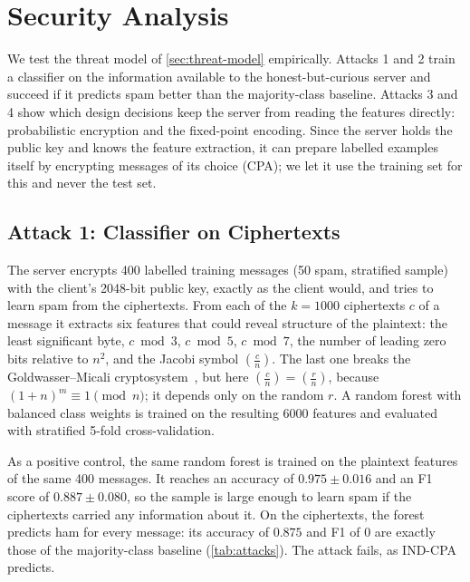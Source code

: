 \section{Security Analysis}\label{sec:security}

We test the threat model of \cref{sec:threat-model} empirically.
Attacks 1 and 2 train a classifier on the information available to the honest-but-curious server and succeed if it predicts spam better than the majority-class baseline.
Attacks 3 and 4 show which design decisions keep the server from reading the features directly: probabilistic encryption and the fixed-point encoding.
Since the server holds the public key and knows the feature extraction, it can prepare labelled examples itself by encrypting messages of its choice (CPA); we let it use the training set for this and never the test set.

\subsection{Attack 1: Classifier on Ciphertexts}\label{sec:attack-ciphertext}

The server encrypts \num{400} labelled training messages (\num{50} spam, stratified sample) with the client's \num{2048}-bit public key, exactly as the client would, and tries to learn spam from the ciphertexts.
From each of the $k = 1000$ ciphertexts $c$ of a message it extracts six features that could reveal structure of the plaintext: the least significant byte, $c \bmod 3$, $c \bmod 5$, $c \bmod 7$, the number of leading zero bits relative to $n^2$, and the Jacobi symbol $\left(\frac{c}{n}\right)$.
The last one breaks the Goldwasser--Micali cryptosystem~\cite{goldwasser1984}, but here $\left(\frac{c}{n}\right) = \left(\frac{r}{n}\right)$, because $(1 + n)^m \equiv 1 \pmod{n}$; it depends only on the random $r$.
A random forest with balanced class weights is trained on the resulting \num{6000} features and evaluated with stratified 5-fold cross-validation.

As a positive control, the same random forest is trained on the plaintext features of the same \num{400} messages.
It reaches an accuracy of $0.975 \pm 0.016$ and an F1 score of $0.887 \pm 0.080$, so the sample is large enough to learn spam if the ciphertexts carried any information about it.
On the ciphertexts, the forest predicts ham for every message: its accuracy of $0.875$ and F1 of $0$ are exactly those of the majority-class baseline (\cref{tab:attacks}).
The attack fails, as IND-CPA predicts.

